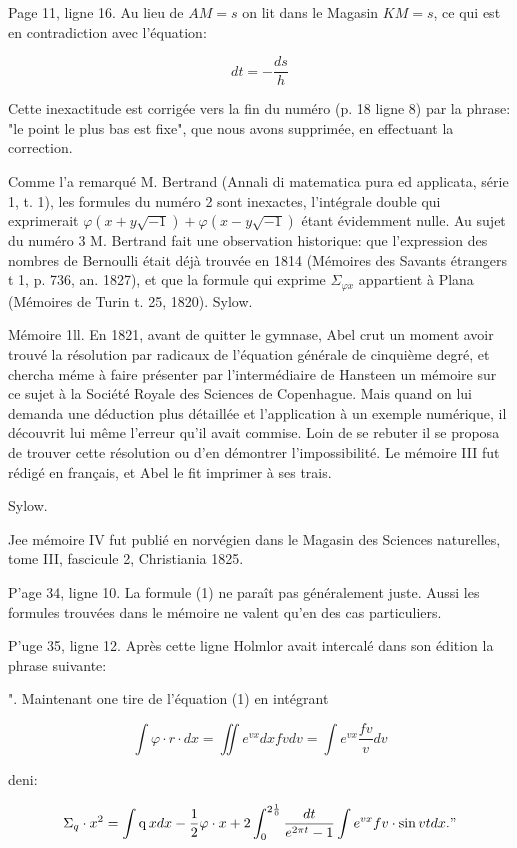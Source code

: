 \documentclass{article}
\begin{document}
Page 11, ligne 16. Au lieu de \(A M=s\) on lit dans le Magasin \(K M=s\), ce qui est en contradiction avec l'équation:

\[
d t=-\frac{d s}{h}
\]

Cette inexactitude est corrigée vers la fin du numéro (p. 18 ligne 8) par la phrase: "le point le plus bas est fixe", que nous avons supprimée, en effectuant la correction.

Comme l'a remarqué M. Bertrand (Annali di matematica pura ed applicata, série 1, t. 1), les formules du numéro 2 sont inexactes, l'intégrale double qui exprimerait \(\varphi(x+y \sqrt{-1})+\varphi(x-y \sqrt{-1})\) étant évidemment nulle. Au sujet du numéro 3 M. Bertrand fait une observation historique: que l'expression des nombres de Bernoulli était déjà trouvée en 1814 (Mémoires des Savants étrangers t 1, p. 736, an. 1827), et que la formule qui exprime \(\Sigma_{\varphi x}\) appartient à Plana (Mémoires de Turin t. 25, 1820). Sylow.

Mémoire 1ll. En 1821, avant de quitter le gymnase, Abel crut un moment avoir trouvé la résolution par radicaux de l'équation générale de cinquième degré, et chercha méme à faire présenter par l'intermédiaire de Hansteen un mémoire sur ce sujet à la Société Royale des Sciences de Copenhague. Mais quand on lui demanda une déduction plus détaillée et l'application à un exemple numérique, il découvrit lui même l'erreur
qu'il avait commise. Loin de se rebuter il se proposa de trouver cette résolution ou d'en démontrer l'impossibilité. Le mémoire III fut rédigé en français, et Abel le fit imprimer à ses trais.

Sylow.

Jee mémoire IV fut publié en norvégien dans le Magasin des Sciences naturelles, tome III, fascicule 2, Christiania 1825.

P'age 34, ligne 10. La formule (1) ne paraît pas généralement juste. Aussi les formules trouvées dans le mémoire ne valent qu'en des cas particuliers.

P'uge 35, ligne 12. Après cette ligne Holmlor avait intercalé dans son édition la phrase suivante:

". Maintenant one tire de l'équation (1) en intégrant

\[
\int \varphi \cdot r \cdot d x=\iint e^{v x} d x f v d v=\int e^{v x} \frac{f v}{v} d v
\]

deni:

\[
\Sigma_{q} \cdot x^{2}=\int \operatorname{q} x d x-\frac{1}{2} \varphi \cdot x+2 \int_{0}^{2 \frac{1}{0}} \frac{d t}{e^{2 \pi t}-1} \int e^{v x} f v \cdot \sin v t d x . "
\]
\end{document}
